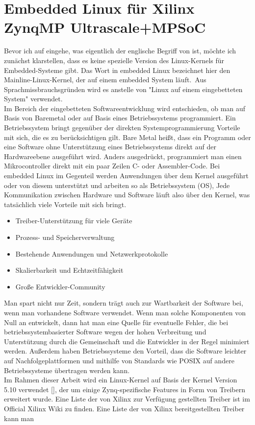 \section{Embedded Linux für Xilinx ZynqMP Ultrascale+MPSoC}
\label{cha:ver:sec:Embedded_Linux}

Bevor ich auf  eingehe, was eigentlich der englische Begriff von  ist, möchte ich zunächst klarstellen, dass es keine spezielle Version des Linux-Kernels für Embedded-Systeme gibt. Das Wort  in embedded Linux bezeichnet hier den Mainline-Linux-Kernel, der auf einem embedded System läuft. Aus Sprachmissbrauchsgründen wird es anstelle von "Linux auf einem eingebetteten System" verwendet.\\
Im Bereich der eingebetteten Softwareentwicklung wird entschieden, ob man auf Basis von Baremetal oder auf Basis eines Betriebssystems programmiert. Ein Betriebssystem bringt gegenüber der direkten Systemprogrammierung Vorteile mit sich, die es zu berücksichtigen gilt. Bare Metal heißt, dass ein Programm oder eine Software ohne Unterstützung eines Betriebssystems direkt auf der Hardwareebene ausgeführt wird. Anders ausgedrückt, programmiert man einen Mikrocontroller direkt mit ein paar Zeilen C- oder Assembler-Code. Bei embedded Linux im Gegenteil werden Anwendungen über dem Kernel ausgeführt oder von diesem unterstützt und arbeiten so als Betriebssystem (OS), Jede Kommunikation zwischen Hardware und Software läuft also über den Kernel, was tatsächlich viele Vorteile mit sich bringt.

\begin{itemize}
	\item Treiber-Unterstützung für viele Geräte
	\item Prozess- und Speicherverwaltung
	\item Bestehende Anwendungen und Netzwerkprotokolle
	\item Skalierbarkeit und Echtzeitfähigkeit 
	\item Große Entwickler-Community
\end{itemize}

Man spart nicht nur Zeit, sondern trägt auch zur Wartbarkeit der Software bei, wenn man vorhandene Software verwendet. Wenn man solche Komponenten von Null an entwickelt, dann hat man eine Quelle für eventuelle Fehler, die bei betriebssystembasierter Software wegen der hohen Verbreitung und Unterstützung durch die Gemeinschaft und die Entwickler in der Regel minimiert werden. Außerdem haben Betriebssysteme den Vorteil, dass die Software leichter auf Nachfolgeplattformen und mithilfe von Standards wie POSIX auf andere Betriebssysteme übertragen werden kann.\\
Im Rahmen dieser Arbeit wird ein Linux-Kernel auf Basis der Kernel Version 5.10 verwendet [\cite{kernel}], der um einige Zynq-spezifische Features in Form von Treibern erweitert wurde. Eine Liste der von Xilinx zur Verfügung gestellten Treiber ist im Official Xilinx Wiki zu finden.
Eine Liste der von Xilinx bereitgestellten Treiber kann man 

